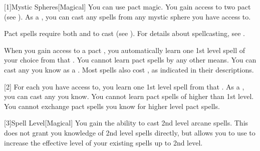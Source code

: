         [1]{Mystic Spheres}[Magical]
        You can use pact magic.
        You gain access to two pact  (see ).
        As a , you can cast any  spells from any mystic sphere you have access to.

        Pact spells require both  and  to cast (see ).
        For details about spellcasting, see .

        When you gain access to a pact , you automatically learn one 1st level spell of your choice from that .
        You cannot learn pact spells by any other means.
        You can cast any  you know as a .
        Most spells also cost , as indicated in their descriptions.

        [2] For each  you have access to, you learn one 1st level spell from that .
        As a , you can cast any  you know.
        You cannot learn pact spells of higher than 1st level.
        You cannot exchange pact spells you know for higher level pact spells.

        [3]{Spell Level}[Magical] You gain the ability to cast 2nd level arcane spells.
        This does not grant you knowledge of 2nd level spells directly, but allows you to use  to increase the effective level of your existing spells up to 2nd level.

